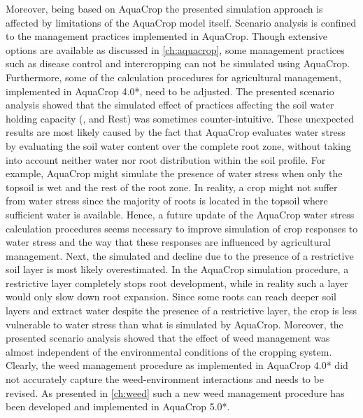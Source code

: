 Moreover, being based on AquaCrop the presented simulation approach is affected by limitations of the AquaCrop model itself. Scenario analysis is confined to the management practices implemented in AquaCrop. Though extensive options are available as discussed in \autoref{ch:aquacrop}, some management practices such as disease control and intercropping can not be simulated using AquaCrop. Furthermore, some of the calculation procedures for agricultural management, implemented in AquaCrop 4.0*, need to be adjusted. The presented scenario analysis showed that the simulated effect of practices affecting the soil water holding capacity (\TAWm, \TAWp and Rest) was sometimes counter-intuitive. These unexpected results are most likely caused by the fact that AquaCrop evaluates water stress by evaluating the soil water content over the complete root zone, without taking into account neither water nor root distribution within the soil profile. For example, AquaCrop might simulate the presence of water stress when only the topsoil is wet and the rest of the root zone. In reality, a crop might not suffer from water stress since the majority of roots is located in the topsoil where sufficient water is available. Hence, a future update of the AquaCrop water stress calculation procedures seems necessary to improve simulation of crop responses to water stress and the way that these responses are influenced by agricultural management. Next, the simulated \Y and \WPET decline due to the presence of a restrictive soil layer is most likely overestimated. In the AquaCrop simulation procedure, a restrictive layer completely stops root development, while in reality such a layer would only slow down root expansion. Since some roots can reach deeper soil layers and extract water despite the presence of a restrictive layer, the crop is less vulnerable to water stress than what is simulated by AquaCrop. Moreover, the presented scenario analysis showed that the effect of weed management was almost independent of the environmental conditions of the cropping system. Clearly, the weed management procedure as implemented in AquaCrop 4.0* did not accurately capture the weed-environment interactions and needs to be revised. As presented in \autoref{ch:weed} such a new weed management procedure has been developed and implemented in AquaCrop 5.0*.
 
